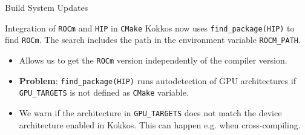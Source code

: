 
\begin{frame}[fragile]

  {\Huge Build System Updates}

  \vspace{10pt}

\end{frame}


\begin{frame}[fragile]{Integration of \texttt{ROCm} and \texttt{HIP} in \texttt{CMake}}
  Kokkos now uses \texttt{find\_package(HIP)} to find \texttt{ROCm}. The search includes the path in the environment variable \texttt{ROCM\_PATH}.
  \begin{itemize}
    \item Allows us to get the \texttt{ROCm} version independently of the compiler version.
    \item \textbf{Problem}: \texttt{find\_package(HIP)} runs autodetection of GPU architectures if \texttt{GPU\_TARGETS} is not defined as \texttt{CMake} variable.
    \item We warn if the architecture in \texttt{GPU\_TARGETS} does not match the device architecture enabled in Kokkos. This can happen e.g. when cross-compiling.
  \end{itemize}
\end{frame}
